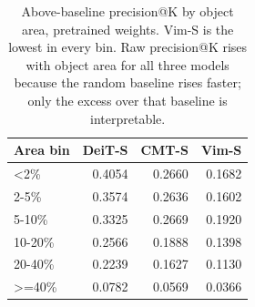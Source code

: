 \begin{table}[tbp]
\centering
\caption{Above-baseline precision@K by object area, pretrained weights. Vim-S is the lowest in every bin. Raw precision@K rises with object area for all three models because the random baseline rises faster; only the excess over that baseline is interpretable.}
\label{tab:e3}
\begin{tabular}{lrrr}
\toprule
Area bin & DeiT-S & CMT-S & Vim-S \\
\midrule
<2\% & 0.4054 & 0.2660 & 0.1682 \\
2-5\% & 0.3574 & 0.2636 & 0.1602 \\
5-10\% & 0.3325 & 0.2669 & 0.1920 \\
10-20\% & 0.2566 & 0.1888 & 0.1398 \\
20-40\% & 0.2239 & 0.1627 & 0.1130 \\
>=40\% & 0.0782 & 0.0569 & 0.0366 \\
\bottomrule
\end{tabular}
\end{table}
